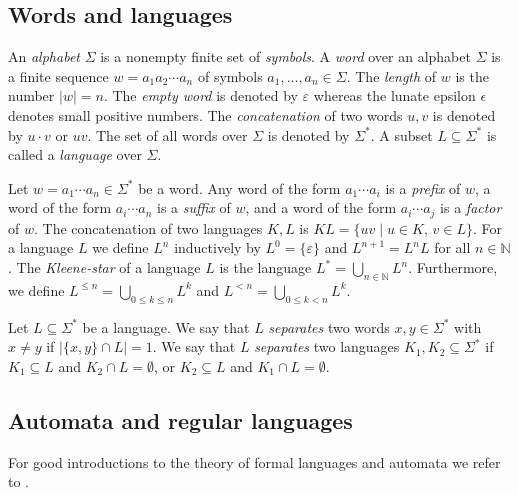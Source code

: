 \documentclass{theoretics}
\newcommand{\N}{\mathbb{N}}
\newcommand{\eps}{\varepsilon}
\renewcommand{\leq}{\leqslant}
\renewcommand{\le}{\leq}
\begin{document}
\label{chap:prelim}

\subsection{Words and languages}

An {\em alphabet} $\Sigma$ is a nonempty finite set of {\em symbols}.
A {\em word} over an alphabet $\Sigma$ is a finite sequence
$w = a_1 a_2 \cdots a_n$ of symbols $a_1, \dots, a_n \in \Sigma$.
The {\em length} of $w$ is the number $|w| = n$. 
The {\em empty word} is denoted by $\eps$
whereas the lunate epsilon $\epsilon$ denotes small positive numbers.
The {\em concatenation} of two words $u,v$ is denoted by $u \cdot v$ or $uv$.
The set of all words over $\Sigma$ is denoted by $\Sigma^*$.
A subset $L \subseteq \Sigma^*$ is called a {\em language} over $\Sigma$.

Let $w = a_1 \cdots a_n \in \Sigma^*$ be a word.
Any word of the form $a_1 \cdots a_i$ is a {\em prefix} of $w$,
a word of the form $a_i \cdots a_n$ is a {\em suffix} of $w$,
and a word of the form $a_i \cdots a_j$ is a {\em factor} of $w$.
The concatenation of two languages $K,L$ is $KL = \{ uv \mid u \in K, \, v \in L \}$.
For a language $L$ we define $L^n$ inductively by $L^0 = \{\varepsilon\}$
and $L^{n+1} = L^n L$ for all $n \in \N$.
The {\em Kleene-star} of a language $L$ is the language $L^* = \bigcup_{n \in \N} L^n$.
Furthermore, we define $L^{\le n} = \bigcup_{0 \le k \le n} L^k$
and $L^{< n} = \bigcup_{0 \le k < n} L^k$.

Let $L \subseteq \Sigma^*$ be a language.
We say that $L$ {\em separates} two words $x,y \in \Sigma^*$ with $x \neq y$ if
$|\{x,y\} \cap L| = 1$.
We say that $L$ {\em separates} two languages $K_1,K_2 \subseteq \Sigma^*$ if
$K_1 \subseteq L$ and $K_2 \cap L = \emptyset$, or
$K_2 \subseteq L$ and $K_1 \cap L = \emptyset$.


\subsection{Automata and regular languages} \label{sec-automata}

For good introductions to the theory of formal languages and automata we refer to \cite{Berstel79,HopcroftU79,Kozen97}.
\end{document}
